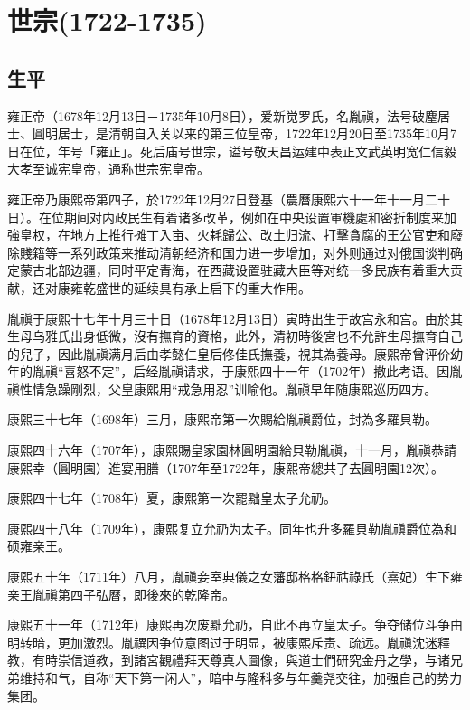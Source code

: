 
\section{世宗\tiny(1722-1735)}

\subsection{生平}

雍正帝（1678年12月13日－1735年10月8日），爱新觉罗氏，名胤禛，法号破塵居士、圓明居士，是清朝自入关以来的第三位皇帝，1722年12月20日至1735年10月7日在位，年号「雍正」。死后庙号世宗，谥号敬天昌运建中表正文武英明宽仁信毅大孝至诚宪皇帝，通称世宗宪皇帝。

雍正帝乃康熙帝第四子，於1722年12月27日登基（農曆康熙六十一年十一月二十日）。在位期间对内政民生有着诸多改革，例如在中央设置軍機處和密折制度来加強皇权，在地方上推行摊丁入亩、火耗歸公、改土归流、打擊貪腐的王公官吏和廢除賤籍等一系列政策来推动清朝经济和国力进一步增加，对外则通过对俄国谈判确定蒙古北部边疆，同时平定青海，在西藏设置驻藏大臣等对统一多民族有着重大贡献，还对康雍乾盛世的延续具有承上启下的重大作用。

胤禛于康熙十七年十月三十日（1678年12月13日）寅時出生于故宫永和宫。由於其生母乌雅氏出身低微，沒有撫育的資格，此外，清初時後宮也不允許生母撫育自己的兒子，因此胤禛满月后由孝懿仁皇后佟佳氏撫養，視其為養母。康熙帝曾评价幼年的胤禛“喜怒不定”，后经胤禛请求，于康熙四十一年（1702年）撤此考语。因胤禛性情急躁剛烈，父皇康熙用“戒急用忍”训喻他。胤禛早年随康熙巡历四方。

康熙三十七年（1698年）三月，康熙帝第一次賜給胤禛爵位，封為多羅貝勒。

康熙四十六年（1707年），康熙賜皇家園林圓明園給貝勒胤禛，十一月，胤禛恭請康熙幸（圓明園）進宴用膳（1707年至1722年，康熙帝總共了去圓明園12次）。

康熙四十七年（1708年）夏，康熙第一次罷黜皇太子允礽。

康熙四十八年（1709年），康熙复立允礽为太子。同年也升多羅貝勒胤禛爵位為和硕雍亲王。

康熙五十年（1711年）八月，胤禛妾室典儀之女藩邸格格鈕祜祿氏（熹妃）生下雍亲王胤禛第四子弘曆，即後來的乾隆帝。

康熙五十一年（1712年）康熙再次废黜允礽，自此不再立皇太子。争夺储位斗争由明转暗，更加激烈。胤禩因争位意图过于明显，被康熙斥责、疏远。胤禛沈迷釋教，有時崇信道教，到諸宮觀禮拜天尊真人圖像，與道士們研究金丹之學，与诸兄弟维持和气，自称“天下第一闲人”，暗中与隆科多与年羹尧交往，加强自己的势力集团。

